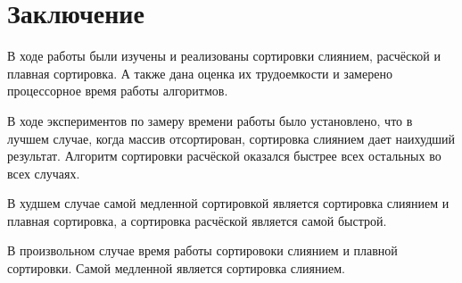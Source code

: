 \section*{\large Заключение}
    \par В ходе работы были изучены и реализованы сортировки слиянием, расчёской и плавная сортировка. А также дана оценка их трудоемкости и замерено процессорное время работы алгоритмов.
    \par В ходе экспериментов по замеру времени работы было установлено, что в лучшем случае, когда массив отсортирован, сортировка слиянием дает наихудший результат. Алгоритм сортировки расчёской оказался быстрее всех остальных во всех случаях.
	\par В худшем случае самой медленной сортировкой является сортировка слиянием и плавная сортировка, а сортировка расчёской является самой быстрой.
	\par В произвольном случае время работы сортировоки слиянием и плавной сортировки. Самой медленной является сортировка слиянием.
\newpage
